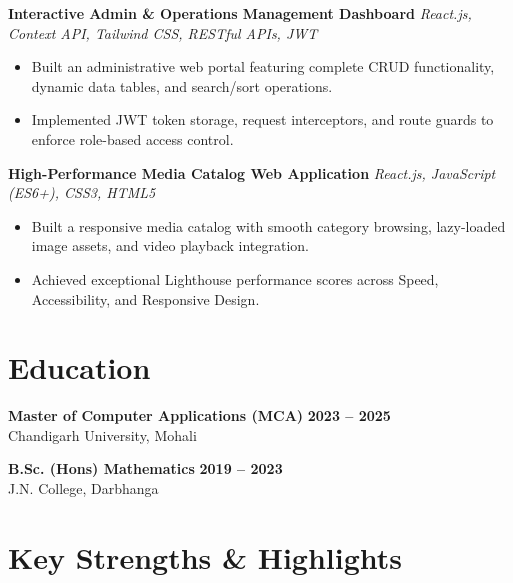 \documentclass[a4paper,10pt]{article}
\begin{document}
\textbf{Interactive Admin \& Operations Management Dashboard}
\hfill
\textit{React.js, Context API, Tailwind CSS, RESTful APIs, JWT}

\begin{itemize}

    \item Built an administrative web portal featuring complete CRUD functionality, dynamic data tables, and search/sort operations.

    \item Implemented JWT token storage, request interceptors, and route guards to enforce role-based access control.

\end{itemize}


\textbf{High-Performance Media Catalog Web Application}
\hfill
\textit{React.js, JavaScript (ES6+), CSS3, HTML5}

\begin{itemize}

    \item Built a responsive media catalog with smooth category browsing, lazy-loaded image assets, and video playback integration.

    \item Achieved exceptional Lighthouse performance scores across Speed, Accessibility, and Responsive Design.

\end{itemize}

\section*{Education}

\textbf{Master of Computer Applications (MCA)}
\hfill
\textbf{2023 -- 2025}
\\
Chandigarh University, Mohali

\vspace{3pt}

\textbf{B.Sc. (Hons) Mathematics}
\hfill
\textbf{2019 -- 2023}
\\
J.N. College, Darbhanga

\section*{Key Strengths \& Highlights}
\end{document}
